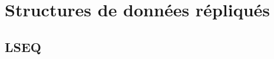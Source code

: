 
\part{Structures de données répliqués}











\chapter{LSEQ}
\label{repl:chap:lseq}
\minitoc




